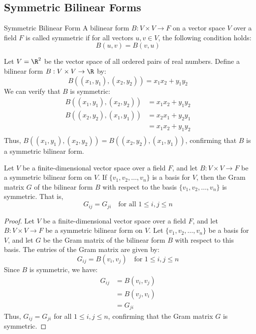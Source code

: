 \documentclass[openany]{book}
\begin{document}
\subsection{Symmetric Bilinear Forms}
\begin{mydefinition}{Symmetric Bilinear Form}
A bilinear form $B: V \times V \to F$ on a vector space $V$ over a field $F$ is called symmetric if for all vectors $u, v \in V$, the following condition holds:
$$B(u, v) = B(v, u)$$
\end{mydefinition}
\begin{example}
Let $V = \R^2$ be the vector space of all ordered pairs of real numbers. Define a bilinear form $B: V \times V \to \R$ by:
$$B((x_1, y_1), (x_2, y_2)) = x_1x_2 + y_1y_2$$
We can verify that $B$ is symmetric:
\[\begin{aligned}
B((x_1, y_1), (x_2, y_2)) &= x_1x_2 + y_1y_2 \\
B((x_2, y_2), (x_1, y_1)) &= x_2x_1 + y_2y_1 \\
&= x_1x_2 + y_1y_2 \\
\end{aligned}\]
Thus, $B((x_1, y_1), (x_2, y_2)) = B((x_2, y_2), (x_1, y_1))$, confirming that $B$ is a symmetric bilinear form.
\end{example}
\begin{mytheorem}
Let $V$ be a finite-dimensional vector space over a field $F$, and let $B: V \times V \to F$ be a symmetric bilinear form on $V$. If $\{v_1, v_2, \ldots, v_n\}$ is a basis for $V$, then the Gram matrix $G$ of the bilinear form $B$ with respect to the basis $\{v_1, v_2, \ldots, v_n\}$ is symmetric. That is,
$$G_{ij} = G_{ji} \quad \text{for all }1 \leq i, j \leq n$$
\end{mytheorem}
\begin{proof}
Let $V$ be a finite-dimensional vector space over a field $F$, and let $B: V \times V \to F$ be a symmetric bilinear form on $V$. Let $\{v_1, v_2, \ldots, v_n\}$ be a basis for $V$, and let $G$ be the Gram matrix of the bilinear form $B$ with respect to this basis. The entries of the Gram matrix are given by:
$$G_{ij} = B(v_i, v_j) \quad \text{for } 1 \leq i, j \leq n$$
Since $B$ is symmetric, we have:
\[\begin{aligned}
G_{ij} &= B(v_i, v_j) \\
&= B(v_j, v_i) \\
&= G_{ji}
\end{aligned}\]
Thus, $G_{ij} = G_{ji}$ for all $1 \leq i, j \leq n$, confirming that the Gram matrix $G$ is symmetric.
\end{proof}
\end{document}
